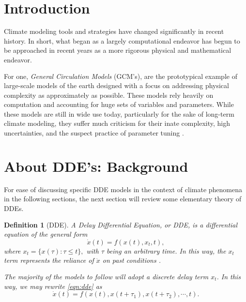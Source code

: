 \documentclass[12pt]{article}
\newtheorem{definition}{Definition}
\begin{document}
\small{\tableofcontents}

\section{Introduction}

Climate modeling tools and strategies have changed significantly in recent history. In short, what began as a largely computational endeavor has begun to be approached in recent years as a more rigorous physical and mathematical endeavor.

For one, \emph{General Circulation Models} (GCM's), are the prototypical example of large-scale models of the earth designed with a focus on addressing physical complexity as approximately as possible. These models rely heavily on computation and accounting for huge sets of variables and parameters. While these models are still in wide use today, particularly for the sake of long-term climate modeling, they suffer much criticism for their inate complexity, high uncertainties, and the suspect practice of parameter tuning \cite{gcmobsolete} \cite{climatedde}.


\section{About DDE's: Background}

For ease of discussing specific DDE models in the context of climate phenomena in the following sections, the next section will review some elementary theory of DDEs.

\begin{definition}[DDE]
    A Delay Differential Equation, or DDE, is a differential equation of the general form \begin{equation}\label{eqn:dde}
    \dot{x}(t) = f(x(t), x_t, t),
    \end{equation}
    where $x_t = \{x(\tau) : \tau \leq t\},$ with $\tau$ being an arbitrary time. In this way, the $x_t$ term represents the reliance of $\dot{x}$ on past conditions\cite{DDEtext} \cite{functionalDDEtext}.

    The majority of the models to follow will adopt a discrete delay term $x_t$. In this way, we may rewrite \cref{eqn:dde} as \begin{equation}\label{eqn:discretedde}
        \dot{x}(t) = f(x(t), x(t + \tau_1), x(t+\tau_2), \cdots, t).
    \end{equation}
\end{definition}
\end{document}

